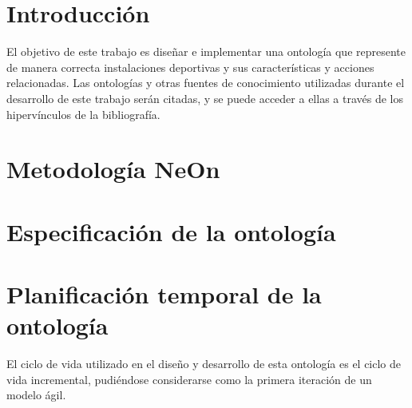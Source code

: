 \documentclass[a4paper,12pt]{article}
\begin{document}
	
	\setlength{\parindent}{0.5cm}
	\setlength{\voffset}{-2cm}
	\setlength{\hoffset}{-2cm}
	
	
	
	\tableofcontents
	
\newpage

	\section{Introducción}
	
	El objetivo de este trabajo es diseñar e implementar una ontología que represente de manera correcta instalaciones deportivas y sus características y acciones relacionadas. Las ontologías y otras fuentes de conocimiento utilizadas durante el desarrollo de este trabajo serán citadas, y se puede acceder a ellas a través de los hipervínculos de la bibliografía.
	
	\section{Metodología NeOn}
	
	\section{Especificación de la ontología}
	
	\section{Planificación temporal de la ontología}
		
	El ciclo de vida utilizado en el diseño y desarrollo de esta ontología es el ciclo de vida incremental, pudiéndose considerarse como la primera iteración de un modelo ágil.
	
\end{document}
